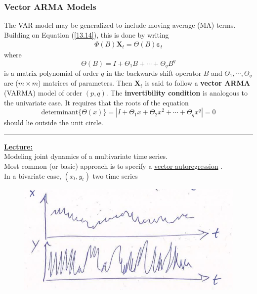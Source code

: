\subsubsection{Vector ARMA Models}

The VAR model may be generalized to include moving average (MA) terms. Building on Equation (\ref{13.14}), this is done by writing \begin{align}
    \Phi (B) \mathbf{X}_t =\Theta(B)\mathbf{\varepsilon}_t
\end{align} where \[
\Theta(B)=I+\Theta_1 B+ \cdots + \Theta_q B^q
\] is a matrix polynomial of order $q$ in the backwards shift operator $B$ and $\Theta_1, \cdots, \Theta_q$ are ($m\times m$) matrices of parameters. Then $\mathbf{X}_t$ is said to follow a \textbf{vector ARMA} (VARMA) model of order $(p,q)$. The \textbf{invertibility condition} is analogous to the univariate case. It requires that the roots of the equation \[ 
\text{determinant}\{\Theta(x)\} =|I+\Theta_1 x + \Theta_2 x^2 + \cdots + \Theta_q x^q|=0
\] should lie outside the unit circle.
 
 \rule{\textwidth}{0.4pt}












\bigskip
\noindent
\textbf{\underline{Lecture:}}\\

Modeling joint dynamics of a multivariate time series.\\
\quad Most common (or basic) approach is to specify a \underline{vector autoregression} .\\

In a bivariate case, $(x_t,y_t) $ two time series
\begin{figure}[H]
    \centering
    \includegraphics[width=0.75\linewidth]{images/Screenshot 2024-05-21 at 18.18.51.jpg}
\end{figure}

